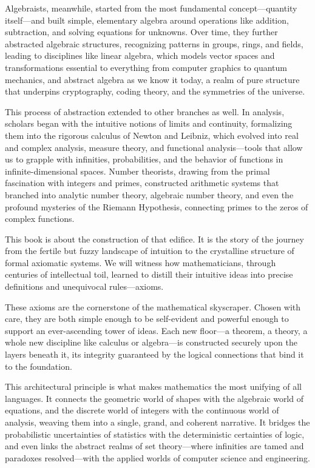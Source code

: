 \documentclass[oneside]{book}
\begin{document}
Algebraists, meanwhile, started from the most fundamental concept—quantity itself—and built simple, elementary algebra around operations like addition, subtraction, and solving equations for unknowns. Over time, they further abstracted algebraic structures, recognizing patterns in groups, rings, and fields, leading to disciplines like linear algebra, which models vector spaces and transformations essential to everything from computer graphics to quantum mechanics, and abstract algebra as we know it today, a realm of pure structure that underpins cryptography, coding theory, and the symmetries of the universe.

This process of abstraction extended to other branches as well. In analysis, scholars began with the intuitive notions of limits and continuity, formalizing them into the rigorous calculus of Newton and Leibniz, which evolved into real and complex analysis, measure theory, and functional analysis—tools that allow us to grapple with infinities, probabilities, and the behavior of functions in infinite-dimensional spaces. Number theorists, drawing from the primal fascination with integers and primes, constructed arithmetic systems that branched into analytic number theory, algebraic number theory, and even the profound mysteries of the Riemann Hypothesis, connecting primes to the zeros of complex functions.

This book is about the construction of that edifice. It is the story of the journey from the fertile but fuzzy landscape of intuition to the crystalline structure of formal axiomatic systems. We will witness how mathematicians, through centuries of intellectual toil, learned to distill their intuitive ideas into precise definitions and unequivocal rules—axioms.

These axioms are the cornerstone of the mathematical skyscraper. Chosen with care, they are both simple enough to be self-evident and powerful enough to support an ever-ascending tower of ideas. Each new floor—a theorem, a theory, a whole new discipline like calculus or algebra—is constructed securely upon the layers beneath it, its integrity guaranteed by the logical connections that bind it to the foundation.

This architectural principle is what makes mathematics the most unifying of all languages. It connects the geometric world of shapes with the algebraic world of equations, and the discrete world of integers with the continuous world of analysis, weaving them into a single, grand, and coherent narrative. It bridges the probabilistic uncertainties of statistics with the deterministic certainties of logic, and even links the abstract realms of set theory—where infinities are tamed and paradoxes resolved—with the applied worlds of computer science and engineering.
\end{document}
